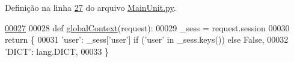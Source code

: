 Definição na linha \hyperlink{MainUnit_8py_source_l00027}{27} do arquivo \hyperlink{MainUnit_8py_source}{Main\-Unit.\-py}.


\begin{DoxyCode}
\hypertarget{namespaceELO_1_1MainUnit_l00027}{}\hyperlink{namespaceELO_1_1MainUnit_a021ebb0ec94aea9dca4014a7218ec38d}{00027} 
00028 \textcolor{keyword}{def }\hyperlink{namespaceELO_1_1MainUnit_a021ebb0ec94aea9dca4014a7218ec38d}{globalContext}(request):
00029     \_sess = request.session
00030     \textcolor{keywordflow}{return} \{
00031             \textcolor{stringliteral}{'user'}: \_sess[\textcolor{stringliteral}{'user'}] \textcolor{keywordflow}{if} (\textcolor{stringliteral}{'user'} \textcolor{keywordflow}{in} \_sess.keys()) \textcolor{keywordflow}{else} \textcolor{keyword}{False},
00032             \textcolor{stringliteral}{'DICT'}: lang.DICT,
00033         \}

\end{DoxyCode}
